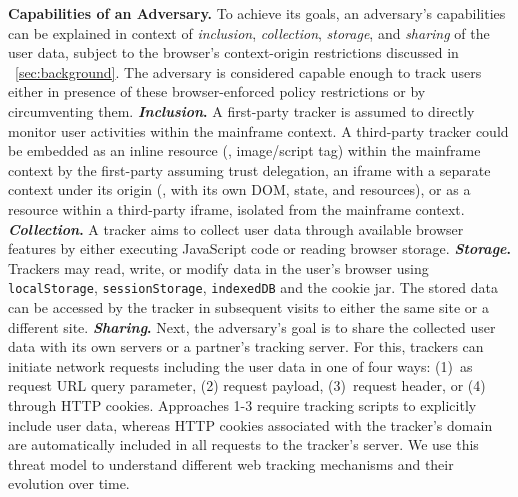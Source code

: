 \noindent \textbf{Capabilities of an Adversary.} 
%
%
To achieve its goals, an adversary's capabilities can be explained in context of \textit{inclusion}, \textit{collection}, \textit{storage}, and \textit{sharing} of the user data, subject to the browser's context-origin restrictions discussed in ~\autoref{sec:background}.
%
The adversary is considered capable enough to track users either in presence of these browser-enforced policy restrictions or by circumventing them.
%
\textbf{\textit{Inclusion}.} 
%
A first-party tracker is assumed to directly monitor user activities within the mainframe context.
%
A third-party tracker could be embedded as an inline resource (\eg{}, image/script tag) within the mainframe context by the first-party assuming trust delegation, an iframe with a separate context under its origin (\ie{}, with its own DOM, state, and resources), or as a resource within a third-party iframe, isolated from the mainframe context. 
%
%
\textbf{\textit{Collection}.}
%
A tracker aims to collect user data through available browser features by either executing JavaScript code or reading browser storage.
%
\textbf{\textit{Storage}.}
%
Trackers may read, write, or modify data in the user's browser using \texttt{localStorage}, \texttt{sessionStorage}, \texttt{indexedDB} and the cookie jar.
%
The stored data can be accessed by the tracker in subsequent visits to either the same site or a different site.
%
\textbf{\textit{Sharing}.}
%
Next, the adversary's goal is to share the collected user data with its own servers or a partner's tracking server.
%
For this, trackers can initiate network requests including the user data in one of four ways: (1)~as request URL query parameter, (2) request payload, (3)~request header, or (4) through HTTP cookies.
%
Approaches 1-3 require tracking scripts to explicitly include user data, whereas HTTP cookies associated with the tracker's domain are automatically included in all requests to the tracker's server. %
%
We use this threat model to understand different web tracking mechanisms and their evolution over time.


